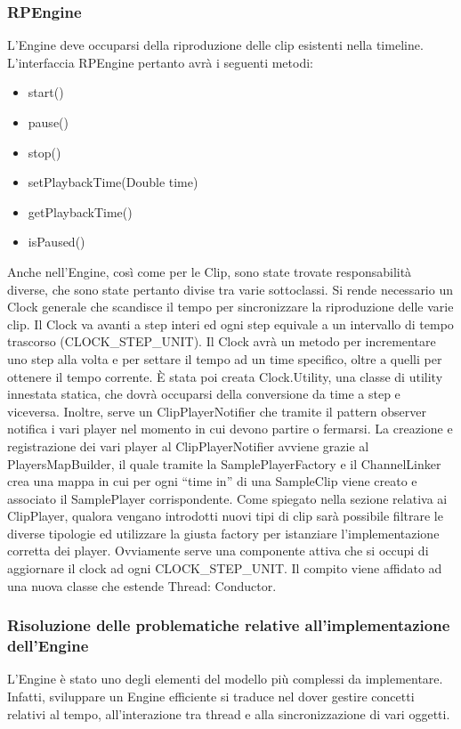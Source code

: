 \documentclass[a4paper,12pt]{report}
\begin{document}
\subsubsection{RPEngine}
L’Engine deve occuparsi della riproduzione delle clip esistenti nella timeline.
L’interfaccia RPEngine pertanto avrà i seguenti metodi:
\begin{itemize}
    \item start()
    \item pause()
    \item stop()
    \item setPlaybackTime(Double time)
    \item getPlaybackTime()
    \item isPaused()
\end{itemize}
Anche nell’Engine, così come per le Clip, sono state trovate responsabilità diverse, che sono state pertanto divise tra varie sottoclassi.
Si rende necessario un Clock generale che scandisce il tempo per sincronizzare la riproduzione delle varie clip.
Il Clock va avanti a step interi ed ogni step equivale a un intervallo di tempo trascorso (CLOCK\_STEP\_UNIT).
Il Clock avrà un metodo per incrementare uno step alla volta e per settare il tempo ad un time specifico, oltre a quelli per ottenere il tempo corrente.
È stata poi creata Clock.Utility, una classe di utility innestata statica, che dovrà occuparsi della conversione da time a step e viceversa.
Inoltre, serve un ClipPlayerNotifier che tramite il pattern observer notifica i vari player nel momento in cui devono partire o fermarsi.
La creazione e registrazione dei vari player al ClipPlayerNotifier avviene grazie al PlayersMapBuilder, il quale tramite la SamplePlayerFactory e il ChannelLinker crea una mappa in cui per ogni “time in” di una SampleClip viene creato e associato il SamplePlayer corrispondente.
Come spiegato nella sezione relativa ai ClipPlayer, qualora vengano introdotti nuovi tipi di clip sarà possibile filtrare le diverse tipologie ed utilizzare la giusta factory per istanziare l’implementazione corretta dei player.
Ovviamente serve una componente attiva che si occupi di aggiornare il clock ad ogni CLOCK\_STEP\_UNIT. Il compito viene affidato ad una nuova classe che estende Thread: Conductor.

\subsubsection{Risoluzione delle problematiche relative all’implementazione dell’Engine}
L’Engine è stato uno degli elementi del modello più complessi da implementare. Infatti, sviluppare un Engine efficiente si traduce nel dover gestire concetti relativi al tempo, all’interazione tra thread e alla sincronizzazione di vari oggetti.
\end{document}
